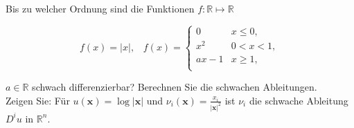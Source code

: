 \begin{exercise}

Bis zu welcher Ordnung sind die Funktionen $f: \mathbb{R} \mapsto \mathbb{R}$

\begin{equation*}
    f(x) = |x|, \hspace{10pt} f(x) =
    \begin{cases}
    0 & x \leq 0, \\
    x^2 & 0 < x < 1, \\
    ax - 1 & x \geq 1, \\
    \end{cases}
\end{equation*}

$a \in \mathbb{R}$ schwach differenzierbar? Berechnen Sie die schwachen Ableitungen. \\

Zeigen Sie: Für $u(\textbf{x}) = \log|\textbf{x}|$ und $\nu_i(\textbf{x}) = \frac{x_i}{|\textbf{x}|^2}$ ist $\nu_i$ die schwache Ableitung $D^iu$ in $\mathbb{R}^n$.

\end{exercise}


